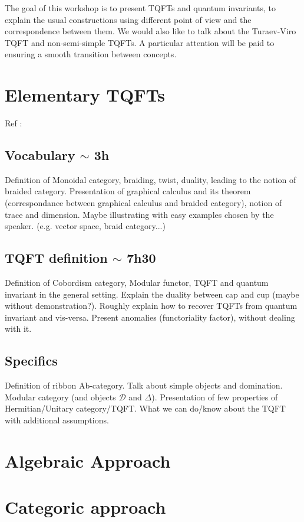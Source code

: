 \documentclass{article}
\begin{document}
The goal of this workshop is to present TQFTs and quantum invariants, to explain the usual constructions using different point of view and the correspondence between them. We would also like to talk about the Turaev-Viro TQFT and non-semi-simple TQFTs. A particular attention will be paid to ensuring a smooth transition between concepts.

\section{Elementary TQFTs} Ref : \cite{Tur}
\subsection{Vocabulary $\sim$ 3h} Definition of Monoidal category, braiding, twist, duality, leading to the notion of braided category. Presentation of graphical calculus and its theorem (correspondance between graphical calculus and braided category), notion of trace and dimension. Maybe illustrating with easy examples chosen by the speaker. (e.g. vector space, braid category...)

\subsection{TQFT definition $\sim$ 7h30} Definition of Cobordism category, Modular functor, TQFT and quantum invariant in the general setting. Explain the duality between cap and cup (maybe without demonstration?). Roughly explain how to recover TQFTs from quantum invariant and vis-versa. Present anomalies (functoriality factor), without dealing with it.

\subsection{Specifics} Definition of ribbon Ab-category. Talk about simple objects and domination. Modular category (and objects $\mathcal{D}$ and $\Delta$). Presentation of few properties of Hermitian/Unitary category/TQFT. What we can do/know about the TQFT with additional assumptions.

\section{Algebraic Approach} 

\section{Categoric approach} 
\end{document}
